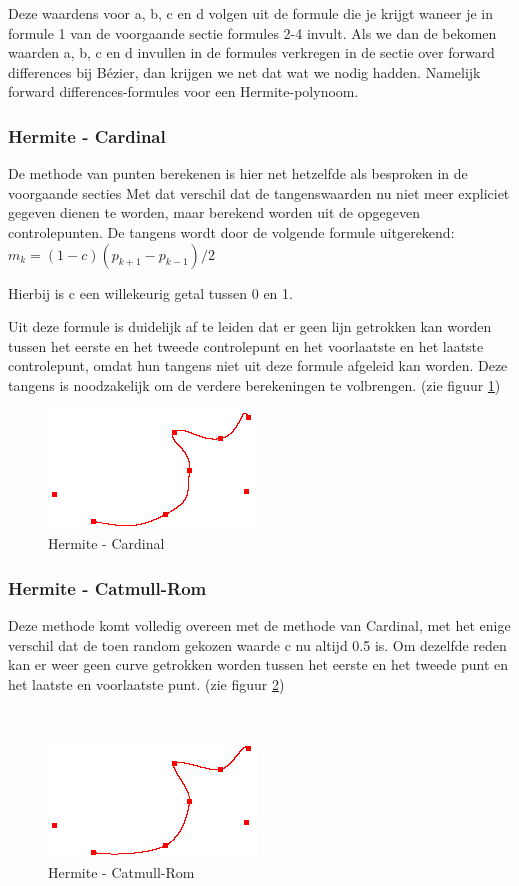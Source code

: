 \documentclass[a4paper,11pt,oneside, titlepage]{article}
\begin{document}
Deze waardens voor a, b, c en d volgen uit de formule die je krijgt waneer je in formule 1 van de voorgaande sectie formules 2-4 invult.
Als we dan de bekomen waarden a, b, c en d invullen in de formules verkregen in de sectie
over forward differences bij B\'ezier, dan krijgen we net dat wat we nodig hadden. Namelijk
forward differences-formules voor een Hermite-polynoom.
\subsubsection{Hermite - Cardinal}
De methode van punten berekenen is hier net hetzelfde als besproken in de voorgaande secties
Met dat verschil dat de tangenswaarden nu niet meer expliciet gegeven dienen te worden, maar 
berekend worden uit de opgegeven controlepunten. 
De tangens wordt door de volgende formule uitgerekend:\newline 
$m_k = (1 - c)(p_{k+1} -p_{k-1})/2$

Hierbij is c een willekeurig getal tussen 0 en 1.

Uit deze formule is duidelijk af te leiden dat er geen lijn getrokken kan worden 
tussen het eerste en het tweede controlepunt en het voorlaatste en het laatste controlepunt, omdat hun tangens niet uit deze formule afgeleid kan worden. Deze tangens is noodzakelijk
om de verdere berekeningen te volbrengen. (zie figuur \ref{cardinal})
\begin{figure}[htbp]
\begin{center}
\includegraphics[scale=0.4]{./screenies2/cardinal.png}
\caption{Hermite - Cardinal}\label{cardinal}
\end{center}
\end{figure}
\subsubsection{Hermite - Catmull-Rom}
Deze methode komt volledig overeen met de methode van Cardinal, met het enige verschil dat
de toen random gekozen waarde c nu altijd 0.5 is. Om dezelfde reden kan er weer geen curve getrokken
worden tussen het eerste en het tweede punt en het laatste en voorlaatste punt. (zie figuur
\ref{catmull})
\begin{figure}[htbp]\
\begin{center}
\includegraphics[scale=0.4]{./screenies2/catmull.png}
\caption{Hermite - Catmull-Rom}\label{catmull}
\end{center}
\end{figure}
\end{document}
